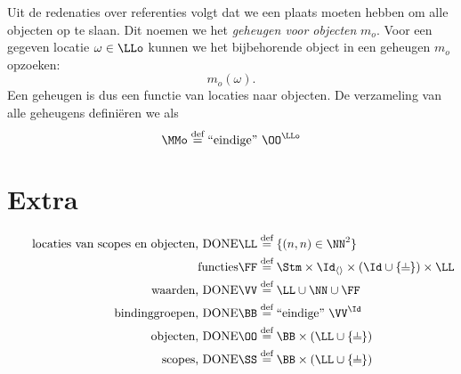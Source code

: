 Uit de redenaties over referenties volgt dat we een plaats moeten hebben om alle objecten op te slaan. Dit noemen we het \emph{geheugen voor objecten} $m_o$. Voor een gegeven locatie $\omega\in\LLo$ kunnen we het bijbehorende object in een geheugen $m_o$ opzoeken:
%
\begin{equation*}
  m_o(\omega).
\end{equation*}
%
Een geheugen is dus een functie van locaties naar objecten. De verzameling van alle geheugens definiëren we als
%
\begin{equation*}
  \MMo \DEF \FiniteFunctions{\OO}{\LLo}
\end{equation*}

\section*{Extra}

\begin{align*}
  \tag*{locaties van scopes en objecten, DONE}
  \LL &\DEF \{ (n, n) \in \NN^2 \} \\
  \tag*{functies}
  \FF &\DEF \Stm \times \Id_{\langle\rangle} \times (\Id \cup \{\nil\}) \times \LL \\
  \tag*{waarden, DONE}
  \VV &\DEF \LL \cup \NN \cup \FF \\
  \tag*{bindinggroepen, DONE}
  \BB &\DEF \FiniteFunctions{\VV}{\Id} \\
  \tag*{objecten, DONE}
  \OO &\DEF \BB \times (\LL \cup \{\nil\}) \\
  \tag*{scopes, DONE}
  \SS &\DEF \BB \times (\LL \cup \{\nil\}) \\
\end{align*}

